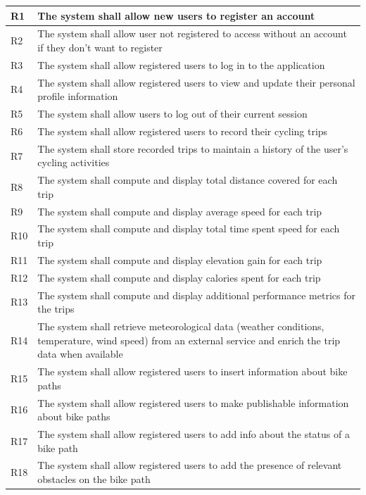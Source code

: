 \begin{longtable}{|l|p{14cm}|}
        R1 & The system shall allow new users to register an account \\ \hline
        R2 & The system shall allow user not registered to access without an account if they don't want to register\\ \hline
        R3 & The system shall allow registered users to log in to the application \\ \hline
        R4 & The system shall allow registered users to view and update their personal profile information \\ \hline
        R5 & The system shall allow users to log out of their current session \\ \hline
        R6 & The system shall allow registered users to record their cycling trips \\ \hline
        R7 & The system shall store recorded trips to maintain a history of the user's cycling activities \\ \hline
        R8 & The system shall compute and display total distance covered for each trip \\ \hline
        R9 & The system shall compute and display average speed for each trip \\ \hline
        R10 & The system shall compute and display total time spent speed for each trip \\ \hline
        R11 & The system shall compute and display elevation gain for each trip \\ \hline
        R12 & The system shall compute and display calories spent for each trip \\ \hline
        R13 & The system shall compute and display additional performance metrics for the trips \\ \hline
        R14 & The system shall retrieve meteorological data (weather conditions, temperature, wind speed) from an external service and enrich the trip data when available \\ \hline
        R15 & The system shall allow registered users to insert information about bike paths \\ \hline
        R16 & The system shall allow registered users to make publishable information about bike paths \\ \hline
        R17 & The system shall allow registered users to add info about the status of a bike path \\ \hline
        R18 & The system shall allow registered users to add the presence of relevant obstacles on the bike path \\ \hline

\end{longtable}
